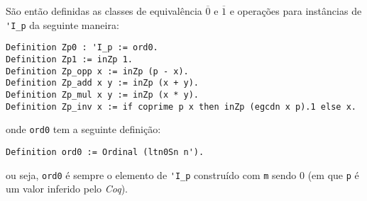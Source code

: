 São então definidas as classes de equivalência $\overline{0}$ e $\overline{1}$ e operações para instâncias de \lstinline[language = coq]{'I_p} da seguinte maneira:
    \begin{lstlisting}[language=coq,frame=single,tabsize=1]
Definition Zp0 : 'I_p := ord0.
Definition Zp1 := inZp 1.
Definition Zp_opp x := inZp (p - x).
Definition Zp_add x y := inZp (x + y).
Definition Zp_mul x y := inZp (x * y).
Definition Zp_inv x := if coprime p x then inZp (egcdn x p).1 else x.
    \end{lstlisting}
onde \lstinline[language = coq]{ord0} tem a seguinte definição:
    \begin{lstlisting}[language=coq,frame=single,tabsize=1]
Definition ord0 := Ordinal (ltn0Sn n').
    \end{lstlisting}
ou seja, \lstinline[language = coq]{ord0} é sempre o elemento de \lstinline[language = coq]{'I_p} construído com \lstinline[language = coq]{m} sendo 0 (em que \lstinline[language = coq]{p} é um valor inferido pelo \textit{Coq}).

